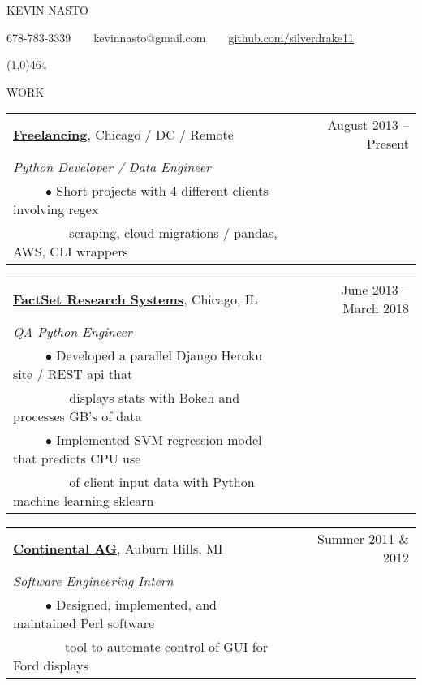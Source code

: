 \documentclass[11pt]{article}
\begin{document}
{\LARGE KEVIN NASTO}

678-78\vphantom{x}3-3339~~\textbullet~~kevin\vphantom{x}nast\vphantom{x}o@g\vphantom{x}mail.com~~\textbullet~~\href{https://github.com/silverdrake11/kevinnasto-cv/blob/master/resume.tex}{github.com/silverdrake11}

\line(1,0){464}
\vspace{.8cm}


{WORK}
\vspace{0.4cm}

\begin{tabularx}{\linewidth}{l X r}
\textbf{\href{https://www.factset.com/}{Freelancing}}, Chicago / DC / Remote & & August 2013 -- Present \\
\emph{Python Developer / Data Engineer} \\
~~~~~$\bullet$ Short projects with 4 different clients involving regex \\
~~~~~~~~ scraping, cloud migrations / pandas, AWS, CLI wrappers\\
\end{tabularx}

\vspace{0.4cm}

\begin{tabularx}{\linewidth}{l X r}
\textbf{\href{https://www.factset.com/}{FactSet Research Systems}}, Chicago, IL & & June 2013 -- March 2018 \\
\emph{QA Python Engineer} \\
~~~~~$\bullet$ Developed a parallel Django Heroku site / REST api that\\
~~~~~~~~ displays stats with Bokeh and processes GB's of data \\
~~~~~$\bullet$ Implemented SVM regression model that predicts CPU use \\
~~~~~~~~ of client input data with Python machine learning sklearn\\
\end{tabularx}

\vspace{0.4cm}

\begin{tabularx}{\linewidth}{l X r}
\textbf{\href{https://www.continental-corporation.com/en}{Continental AG}}, Auburn Hills, MI & & Summer 2011 \& 2012 \\
\emph{Software Engineering Intern} \\
~~~~~$\bullet$ Designed, implemented, and maintained Perl software \\
~~~~~~~~tool to automate control of GUI for Ford displays\\
\end{tabularx}
\end{document}
